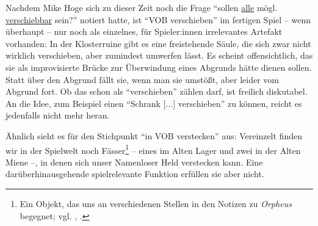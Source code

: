 \documentclass[a5paper,pagesize,numbers=noenddot]{scrbook}
\begin{document}
Nachdem Mike Hoge sich zu dieser Zeit noch die Frage \enquote{sollen \uline{alle} mögl. \uline{verschiebbar} sein?}\autocite[S.~3]{orpheus_interface} notiert hatte, ist \enquote{VOB verschieben} im fertigen Spiel -- wenn überhaupt -- nur noch als einzelnes, für Spieler:innen irrelevantes Artefakt vorhanden:
In der Klosterruine gibt es eine freistehende Säule, die sich zwar nicht wirklich verschieben, aber zumindest umwerfen lässt.
Es scheint offensichtlich, das sie als improvisierte Brücke zur Überwindung eines Abgrunds hätte dienen sollen.
Statt über den Abgrund fällt sie, wenn man sie umstößt, aber leider vom Abgrund fort.
Ob das schon als \enquote{verschieben} zählen darf, ist freilich diskutabel.
An die Idee, zum Beispiel einen \enquote{Schrank [$\ldots$] verschieben}\autocite[S.~3]{orpheus_interface} zu können, reicht es jedenfalls nicht mehr heran.

Ähnlich sieht es für den Stichpunkt \enquote{in VOB verstecken} aus:
Vereinzelt finden wir in der Spielwelt noch Fässer\footnote{Ein Objekt, das uns an verschiedenen Stellen in den Notizen zu \textit{Orpheus} begegnet; vgl. \autocite[S.~19]{orpheus_b_scribbles}, \autocite[S.~6]{orpheus_interface}.} -- eines im Alten Lager und zwei in der Alten Miene --, in denen sich unser Namenloser Held verstecken kann.
Eine darüberhinausgehende spielrelevante Funktion erfüllen sie aber nicht.
\end{document}
